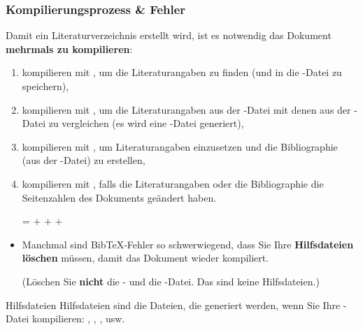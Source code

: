 \begin{frame}[fragile]
\frametitle{Kompilierungsprozess \& Fehler}

Damit ein Literaturverzeichnis erstellt wird, ist es notwendig das Dokument \textbf{mehrmals zu kompilieren}:

\begin{enumerate}
	\item kompilieren mit \textbf{}, um die Literaturangaben zu finden (und in die -Datei zu speichern),

\pause
	
	\item kompilieren mit \textbf{}, um die Literaturangaben aus der -Datei mit denen aus der -Datei zu vergleichen (es wird eine -Datei generiert),

\pause
	
	\item kompilieren mit \textbf{}, um Literaturangaben einzusetzen und die Bibliographie (aus der -Datei) zu erstellen,

\pause
	
	\item kompilieren mit \textbf{}, falls die Literaturangaben oder die Bibliographie die Seitenzahlen des Dokuments geändert haben.

\pause
	
	\item[=]  $+$  $+$  $+$ 
\end{enumerate}

\end{frame}


\begin{frame}[fragile]

\begin{itemize}
	\item Manchmal sind Bib\TeX -Fehler so schwerwiegend, dass Sie Ihre \textbf{Hilfsdateien löschen} müssen, damit das Dokument wieder kompiliert.
	
	(Löschen Sie \textbf{nicht} die - und die   -Datei. Das sind keine Hilfsdateien.)
\end{itemize}
	

\begin{block}{Hilfsdateien}
	Hilfsdateien sind die Dateien, die generiert werden, wenn Sie Ihre -Datei kompilieren: , , , usw.
\end{block}

\end{frame}


